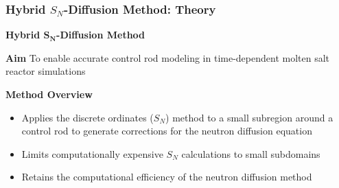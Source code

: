 \begin{frame}
  \frametitle{Hybrid $S_N$-Diffusion Method: Theory}
  \textbf{Hybrid $\bm{S_N}$-Diffusion Method}
  \begin{block}{\textbf{Aim}}
    To enable accurate control rod modeling in time-dependent molten salt reactor simulations
  \end{block}
  \begin{block}{\textbf{Method Overview}}
    \begin{itemize}
      \item Applies the discrete ordinates ($S_N$) method to a small subregion around a
        control rod to generate corrections for the neutron diffusion equation
      \item Limits computationally expensive $S_N$ calculations to small subdomains
      \item Retains the computational efficiency of the neutron diffusion method
    \end{itemize}
  \end{block}
\end{frame}

